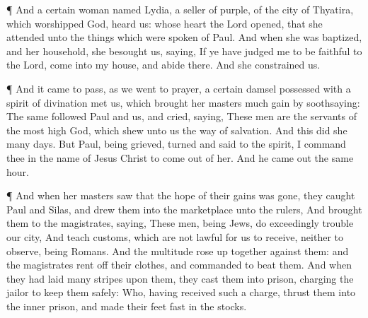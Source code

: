  ¶ And a certain woman named Lydia, a seller of purple, of
the city of Thyatira, which worshipped God, heard us: whose heart the
Lord opened, that she attended unto the things which were spoken of
Paul.  And when she was baptized, and her household, she
besought us, saying, If ye have judged me to be faithful to the Lord,
come into my house, and abide there. And she constrained us.

 ¶ And it came to pass, as we went to prayer, a certain
damsel possessed with a spirit of divination met us, which brought her
masters much gain by soothsaying:  The same followed Paul
and us, and cried, saying, These men are the servants of the most high
God, which shew unto us the way of salvation.  And this did
she many days. But Paul, being grieved, turned and said to the spirit, I
command thee in the name of Jesus Christ to come out of her. And he came
out the same hour.

 ¶ And when her masters saw that the hope of their gains
was gone, they caught Paul and Silas, and drew them into the marketplace
unto the rulers,  And brought them to the magistrates,
saying, These men, being Jews, do exceedingly trouble our city,
 And teach customs, which are not lawful for us to receive,
neither to observe, being Romans.  And the multitude rose
up together against them: and the magistrates rent off their clothes,
and commanded to beat them.  And when they had laid many
stripes upon them, they cast them into prison, charging the jailor to
keep them safely:  Who, having received such a charge,
thrust them into the inner prison, and made their feet fast in the
stocks.

